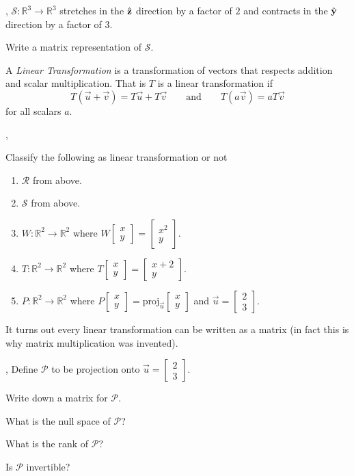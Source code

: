 \documentclass{article}
\newcommand{\yh}{\hat{\bf y}}
\newcommand{\zh}{\hat{\bf z}}
\newcommand{\R}{\mathbb{R}}
\newcommand{\proj}{\mathrm{proj}}
\newcommand{\mat}[1]{\begin{bmatrix}#1\end{bmatrix}}
\newcommand{\sepl}{\sep \vspace{-.35in}}
\begin{document}
\sep
$\mathcal S:\R^3\to\R^3$ stretches in the $\zh$ direction  by a factor of $2$
and contracts in the $\yh$ direction by a factor of $3$.
\begin{Enum}
	\item Write a matrix representation of $\mathcal S$.
\end{Enum}

	\begin{Def}
	A \emph{Linear Transformation} is a transformation of vectors 
	that respects addition and scalar multiplication.  That is $T$
	is a linear transformation if
	\[
		T(\vec u+\vec v)=T\vec u+T\vec v \qquad\text{and}\qquad
		T(a\vec v)=aT\vec v
	\]
	for all scalars $a$.
	\end{Def}

\sepl
\begin{Enum}
	\item Classify the following as linear transformation or not
		\begin{enumerate}
			\item $\mathcal R$ from above.
			\item $\mathcal S$ from above.
			\item $W:\R^2\to\R^2$ where $W\mat{x\\y}=\mat{x^2\\y}$.
			\item $T:\R^2\to\R^2$ where $T\mat{x\\y}=\mat{x+2\\y}$.
			\item $P:\R^2\to\R^2$ where $P\mat{x\\y}=\proj_{\vec u}\mat{x\\y}$ and 
				$\vec u=\mat{2\\3}$.
		\end{enumerate}
\end{Enum}

It turns out every linear transformation can be written as a matrix (in fact
this is why matrix multiplication was invented).

\sep
Define $\mathcal P$ to be projection onto $\vec u=\mat{2\\3}$.
\begin{Enum}
	\item Write down a matrix for $\mathcal P$.
	\item What is the null space of $\mathcal P$?
	\item What is the rank of $\mathcal P$?
	\item Is $\mathcal P$ invertible?
\end{Enum}
\end{document}
